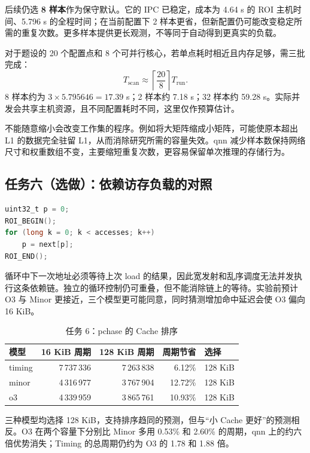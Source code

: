 \documentclass[12pt,a4paper,fontset=mac]{ctexart}
\begin{document}
后续仍选 \textbf{8 样本}作为保守默认。它的 IPC 已稳定，成本为 4.64 s 的 ROI 主机时间、5.796 s 的全程时间；在当前配置下 2 样本更省，但新配置仍可能改变稳定所需的重复次数。更多样本提供更长观测，不等同于自动得到更真实的负载。

对于题设的 20 个配置点和 8 个可并行核心，若单点耗时相近且内存足够，需三批完成：
\[
T_{\mathrm{scan}}\approx\left\lceil\frac{20}{8}\right\rceil T_{\mathrm{run}}.
\]
8 样本约为 $3\times5.795646=17.39$ s；2 样本约 7.18 s；32 样本约 59.28 s。实际并发会共享主机资源，且不同配置耗时不同，这里仅作预算估计。

不能随意缩小会改变工作集的程序。例如将大矩阵缩成小矩阵，可能使原本超出 L1 的数据完全驻留 L1，从而消除研究所需的容量失效。qnn 减少样本数保持网络尺寸和权重数组不变，主要缩短重复次数，更容易保留单次推理的存储行为。

\subsection{任务六（选做）：依赖访存负载的对照}
\begin{lstlisting}[language=C,caption={pchase 的测量循环}]
uint32_t p = 0;
ROI_BEGIN();
for (long k = 0; k < accesses; k++)
    p = next[p];
ROI_END();
\end{lstlisting}
循环中下一次地址必须等待上次 load 的结果，因此宽发射和乱序调度无法并发执行这条依赖链。独立的循环控制仍可重叠，但不能消除链上的等待。实验前预计 O3 与 Minor 更接近，三个模型更可能同意，同时猜测增加命中延迟会使 O3 偏向 16 KiB。

\begin{table}[H]\centering\small
\caption{任务 6：pchase 的 Cache 排序}\label{tab:pchase}
\begin{tabular}{lrrrl}\toprule
模型 & 16 KiB 周期 & 128 KiB 周期 & 周期节省 & 选择 \\\midrule
timing & 7\,737\,336 & 7\,263\,838 & 6.12\% & 128 KiB \\
minor & 4\,316\,977 & 3\,767\,904 & 12.72\% & 128 KiB \\
o3 & 4\,339\,959 & 3\,865\,761 & 10.93\% & 128 KiB \\
\bottomrule\end{tabular}\end{table}
三种模型均选择 128 KiB，支持排序趋同的预测，但与“小 Cache 更好”的预测相反。O3 在两个容量下分别比 Minor 多用 0.53\% 和 2.60\% 的周期，qnn 上的约六倍优势消失；Timing 的总周期仍约为 O3 的 1.78 和 1.88 倍。
\end{document}
